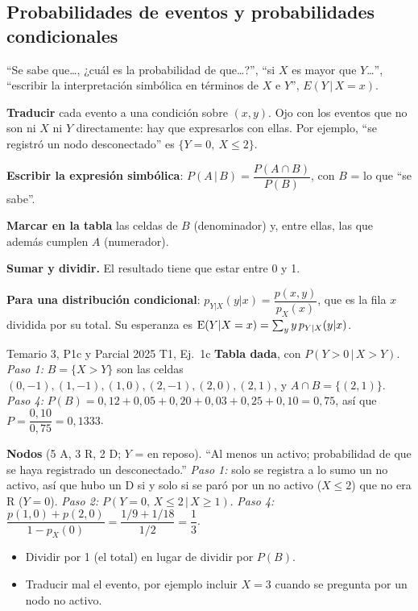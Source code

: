 \subsection{Probabilidades de eventos y probabilidades condicionales}\label{p:condicional}
\begin{cuando}
``Se sabe que\ldots, ¿cuál es la probabilidad de que\ldots?'', ``si $X$ es mayor que $Y$\ldots'', ``escribir la interpretación simbólica en términos de $X$ e $Y$'', $E(Y\,|\,X=x)$.
\end{cuando}
\begin{pasos}
\begin{pasolista}
\item \textbf{Traducir} cada evento a una condición sobre $(x,y)$. Ojo con los eventos que no son ni $X$ ni $Y$ directamente: hay que expresarlos con ellas. Por ejemplo, ``se registró un nodo desconectado'' es $\{Y=0,\ X\le2\}$.
\item \textbf{Escribir la expresión simbólica}: $P(A\,|\,B)=\dfrac{P(A\cap B)}{P(B)}$, con $B$ = lo que ``se sabe''.
\item \textbf{Marcar en la tabla} las celdas de $B$ (denominador) y, entre ellas, las que además cumplen $A$ (numerador).
\item \textbf{Sumar y dividir.} El resultado tiene que estar entre 0 y 1.
\item \textbf{Para una distribución condicional}: $p_{Y|X}(y|x)=\dfrac{p(x,y)}{p_X(x)}$, que es la fila $x$ dividida por su total. Su esperanza es $\mathrm{E}(Y|X=x)=\sum_y y\,p_{Y|X}(y|x)$.
\end{pasolista}
\end{pasos}
\begin{modelo}{Temario 3, P1c y Parcial 2025 T1, Ej.\ 1c}
\textbf{Tabla dada}, con $P(Y>0\,|\,X>Y)$. \emph{Paso 1:} $B=\{X>Y\}$ son las celdas $(0,-1),(1,-1),(1,0),(2,-1),(2,0),(2,1)$, y $A\cap B=\{(2,1)\}$.
\emph{Paso 4:} $P(B)=0{,}12+0{,}05+0{,}20+0{,}03+0{,}25+0{,}10=0{,}75$, así que $P=\dfrac{0{,}10}{0{,}75}=0{,}1333$.

\textbf{Nodos} (5 A, 3 R, 2 D; $Y$ = en reposo). ``Al menos un activo; probabilidad de que se haya registrado un desconectado.''
\emph{Paso 1:} solo se registra a lo sumo un no activo, así que hubo un D si y solo si se paró por un no activo ($X\le2$) que no era R ($Y=0$). \emph{Paso 2:} $P(Y=0,\,X\le2\,|\,X\ge1)$.
\emph{Paso 4:} $\dfrac{p(1,0)+p(2,0)}{1-p_X(0)}=\dfrac{1/9+1/18}{1/2}=\dfrac13$.
\end{modelo}
\begin{ojo}
\begin{itemize}
\item Dividir por 1 (el total) en lugar de dividir por $P(B)$.
\item Traducir mal el evento, por ejemplo incluir $X=3$ cuando se pregunta por un nodo no activo.
\end{itemize}
\end{ojo}


